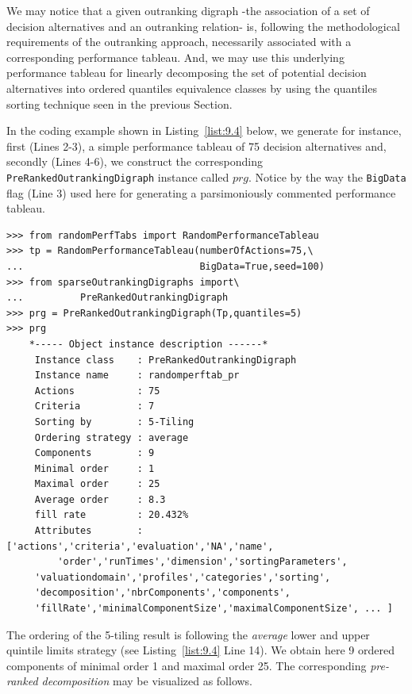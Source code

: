 We may notice that a given outranking digraph -the association of a set of decision alternatives and an outranking relation- is, following the methodological requirements of the outranking approach, necessarily associated with a corresponding performance tableau. And, we may use this underlying performance tableau for linearly decomposing the set of potential decision alternatives into ordered quantiles equivalence classes by using the quantiles sorting technique seen in the previous Section. 

In the coding example shown in Listing~\vref{list:9.4} below, we generate for instance, first (Lines 2-3), a simple performance tableau of 75 decision alternatives and, secondly (Lines 4-6), we construct the corresponding \texttt{PreRankedOutrankingDigraph} instance called $prg$. Notice by the way the \texttt{BigData} flag (Line 3) used here for generating a parsimoniously commented performance tableau.

\begin{lstlisting}[caption={Computing a \emph{pre-ranked} sparse outranking digraph},label=list:9.4]
>>> from randomPerfTabs import RandomPerformanceTableau
>>> tp = RandomPerformanceTableau(numberOfActions=75,\
...                               BigData=True,seed=100)
>>> from sparseOutrankingDigraphs import\
...          PreRankedOutrankingDigraph
>>> prg = PreRankedOutrankingDigraph(Tp,quantiles=5)
>>> prg
    *----- Object instance description ------*
     Instance class    : PreRankedOutrankingDigraph
     Instance name     : randomperftab_pr
     Actions           : 75
     Criteria          : 7
     Sorting by        : 5-Tiling
     Ordering strategy : average
     Components        : 9
     Minimal order     : 1
     Maximal order     : 25
     Average order     : 8.3
     fill rate         : 20.432%
     Attributes        : ['actions','criteria','evaluation','NA','name',
         'order','runTimes','dimension','sortingParameters',
	 'valuationdomain','profiles','categories','sorting',
	 'decomposition','nbrComponents','components',
	 'fillRate','minimalComponentSize','maximalComponentSize', ... ]
\end{lstlisting}

The ordering of the 5-tiling result is following the \emph{average} lower and upper quintile limits strategy (see Listing~\vref{list:9.4} Line 14). We obtain here 9 ordered components of minimal order 1 and maximal order 25. The corresponding \emph{pre-ranked decomposition} may be visualized as follows.

